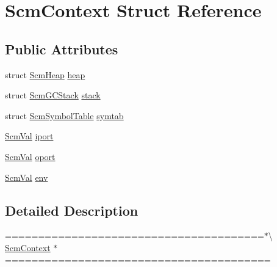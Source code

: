 \hypertarget{struct_scm_context}{\section{Scm\-Context Struct Reference}
\label{struct_scm_context}
}
\subsection*{Public Attributes}
\begin{DoxyCompactItemize}
\item 
struct \hyperlink{struct_scm_heap}{Scm\-Heap} \hyperlink{struct_scm_context_ab8423487a2570390b3b6c4b724c38864}{heap}
\item 
struct \hyperlink{struct_scm_g_c_stack}{Scm\-G\-C\-Stack} \hyperlink{struct_scm_context_af136918a5f570af01f504f3a858378df}{stack}
\item 
struct \hyperlink{struct_scm_symbol_table}{Scm\-Symbol\-Table} \hyperlink{struct_scm_context_a2baaf5bd61ffa1bd8e395bafa9ccd086}{symtab}
\item 
\hyperlink{eva_8h_a9e754b130d398cb7a4000c8c7a046427}{Scm\-Val} \hyperlink{struct_scm_context_a8542de6050cbcf95df9677c6287d8646}{iport}
\item 
\hyperlink{eva_8h_a9e754b130d398cb7a4000c8c7a046427}{Scm\-Val} \hyperlink{struct_scm_context_a1087d86b13a525aa7424c3874935c305}{oport}
\item 
\hyperlink{eva_8h_a9e754b130d398cb7a4000c8c7a046427}{Scm\-Val} \hyperlink{struct_scm_context_a464453bdb8b974f5e38649d7a0664104}{env}
\end{DoxyCompactItemize}


\subsection{Detailed Description}
=======================================$\ast$\textbackslash{} \hyperlink{struct_scm_context}{Scm\-Context} $\ast$======================================== 


